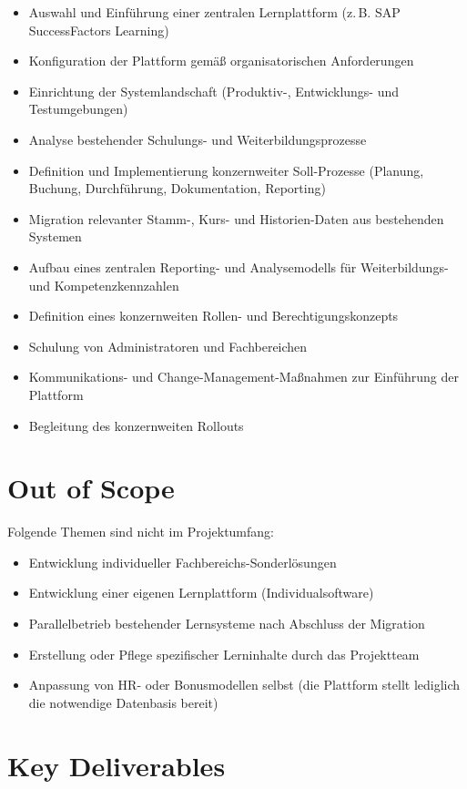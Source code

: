 \begin{itemize}
    \item Auswahl und Einführung einer zentralen Lernplattform (z.\,B. SAP SuccessFactors Learning)
    \item Konfiguration der Plattform gemäß organisatorischen Anforderungen
    \item Einrichtung der Systemlandschaft (Produktiv-, Entwicklungs- und Testumgebungen)
    \item Analyse bestehender Schulungs- und Weiterbildungsprozesse
    \item Definition und Implementierung konzernweiter Soll-Prozesse (Planung, Buchung, Durchführung, Dokumentation, Reporting)
    \item Migration relevanter Stamm-, Kurs- und Historien-Daten aus bestehenden Systemen
    \item Aufbau eines zentralen Reporting- und Analysemodells für Weiterbildungs- und Kompetenzkennzahlen
    \item Definition eines konzernweiten Rollen- und Berechtigungskonzepts
    \item Schulung von Administratoren und Fachbereichen
    \item Kommunikations- und Change-Management-Maßnahmen zur Einführung der Plattform
    \item Begleitung des konzernweiten Rollouts
\end{itemize}

\section{Out of Scope}

Folgende Themen sind nicht im Projektumfang:

\begin{itemize}
    \item Entwicklung individueller Fachbereichs-Sonderlösungen
    \item Entwicklung einer eigenen Lernplattform (Individualsoftware)
    \item Parallelbetrieb bestehender Lernsysteme nach Abschluss der Migration
    \item Erstellung oder Pflege spezifischer Lerninhalte durch das Projektteam
    \item Anpassung von \ac{HR}- oder Bonusmodellen selbst (die Plattform stellt lediglich die notwendige Datenbasis bereit)
\end{itemize}

\section{Key Deliverables}

